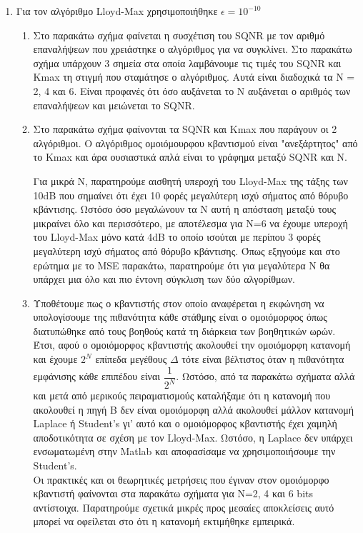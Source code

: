 \documentclass{article}
\begin{document}
\begin{enumerate}
        \item Για τον αλγόριθμο Lloyd-Max χρησιμοποιήθηκε $\epsilon = 10^{-10}$
        \begin{enumerate}[label=(\roman*)]
            \item Στο παρακάτω σχήμα φαίνεται η συσχέτιση του SQNR με τον αριθμό επαναλήψεων που χρειάστηκε ο αλγόριθμος για να συγκλίνει. Στο παρακάτω σχήμα υπάρχουν 3 σημεία στα οποία λαμβάνουμε τις τιμές του SQNR και Kmax τη στιγμή που σταμάτησε ο αλγόριθμος. Αυτά είναι διαδοχικά τα N = 2, 4 και 6. Είναι προφανές ότι όσο αυξάνεται το Ν αυξάνεται ο αριθμός των επαναλήψεων και μειώνεται το SQNR.
                \begin{figure}[H]
                \end{figure}
            \item Στο παρακάτω σχήμα φαίνονται τα SQNR και Kmax που παράγουν οι 2 αλγόριθμοι. Ο αλγόριθμος ομοιόμουρφου κβαντισμού είναι "ανεξάρτητος" από το Kmax και άρα ουσιαστικά απλά είναι το γράφημα μεταξύ SQNR και Ν.
                \begin{figure}[H]
                \end{figure}
            Για μικρά N, παρατηρούμε αισθητή υπεροχή του Lloyd-Max της τάξης των 10dB που σημαίνει ότι έχει 10 φορές μεγαλύτερη ισχύ σήματος από θόρυβο κβάντισης. Ωστόσο όσο μεγαλώνουν τα N αυτή η απόσταση μεταξύ τους μικραίνει όλο και περισσότερο, με αποτέλεσμα για Ν=6 να έχουμε υπεροχή του Lloyd-Max μόνο κατά 4dB το οποίο ισούται με περίπου 3 φορές μεγαλύτερη ισχύ σήματος από θόρυβο κβάντισης. Όπως εξηγούμε και στο ερώτημα με το MSE παρακάτω, παρατηρούμε ότι για μεγαλύτερα Ν θα υπάρχει μια όλο και πιο έντονη σύγκλιση των δύο αλγορίθμων.  
            \item Υποθέτουμε πως ο κβαντιστής στον οποίο αναφέρεται η εκφώνηση να υπολογίσουμε της πιθανότητα κάθε στάθμης είναι ο ομοιόμορφος όπως διατυπώθηκε από τους βοηθούς κατά τη διάρκεια των βοηθητικών ωρών. Έτσι, αφού ο ομοιόμορφος κβαντιστής ακολουθεί την ομοιόμορφη κατανομή και έχουμε $2^N$ επίπεδα μεγέθους $\Delta$ τότε είναι βέλτιστος όταν η πιθανότητα εμφάνισης κάθε επιπέδου είναι $\dfrac{1}{2^N}$. Ωστόσο, από τα παρακάτω σχήματα αλλά και μετά από μερικούς πειραματισμούς καταλήξαμε ότι η κατανομή που ακολουθεί η πηγή Β δεν είναι ομοιόμορφη αλλά ακολουθεί μάλλον κατανομή Laplace ή Student's γι' αυτό και ο ομοιόμορφος κβαντιστής έχει χαμηλή αποδοτικότητα σε σχέση με τον Lloyd-Max. Ωστόσο, η Laplace δεν υπάρχει ενσωματωμένη στην Matlab και αποφασίσαμε να χρησιμοποιήσουμε την Student's.\\
            Οι πρακτικές και οι θεωρητικές μετρήσεις που έγιναν στον ομοιόμορφο κβαντιστή φαίνονται στα παρακάτω σχήματα  για Ν=2, 4 και 6 bits αντίστοιχα. Παρατηρούμε σχετικά μικρές προς μεσαίες αποκλείσεις αυτό μπορεί να οφείλεται στο ότι η κατανομή εκτιμήθηκε εμπειρικά.


\end{enumerate}
\end{enumerate}
\end{document}
